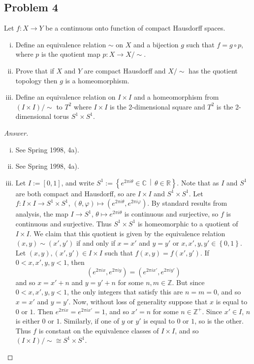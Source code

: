 \documentclass[12pt]{article}
\newcommand{\z}{\mathbb{Z}}
\newcommand{\cx}{\mathbb{C}}
\newcommand{\real}{\mathbb{R}}
\newcommand\paren[1]{\left( #1 \right)}
\newcommand\setb[1]{\left \{ #1 \right \}}
\theoremstyle{definition}
\begin{document}
\subsection{Problem 4}
Let $f : X \to Y$ be a continuous onto function of compact Hausdorff spaces.
\begin{enumerate}[(i)]
    \item Define an equivalence relation $\sim$ on $X$ and a bijection $g$ such that $f = g \circ p$, where $p$ is the quotient map $p : X \to X / \sim$.
    \item Prove that if $X$ and $Y$ are compact Hausdorff and $X / \sim$ has the quotient topology then $g$ is a homeomorphism.
    \item Define an equivalence relation on $I \times I$ and a homeomorphism from $(I \times I) / \sim$ to $T^2$ where $I \times I$ is the 2-dimensional square and $T^2$ is the 2-dimensional torus $S^1 \times S^1$.
\end{enumerate}
\begin{proof}[Answer]
    \noindent
    \begin{enumerate}[(i)]
        \item See Spring 1998, 4a).
        \item See Spring 1998, 4a).
        \item Let $I := [0,1]$, and write $S^1 := \setb{ e^{2\pi i \theta} \in \cx \, \middle| \, \theta \in \real }$. Note that as $I$ and $S^1$ are both compact and Hausdorff, so are $I \times I$ and $S^1 \times S^1$. Let $f : I \times I \to S^1 \times S^1$, $(\theta,\varphi) \mapsto \paren{ e^{2\pi i \theta} , e^{2\pi i \varphi} }$. By standard results from analysis, the map $I \to S^1$, $\theta \mapsto e^{2\pi i \theta}$ is continuous and surjective, so $f$ is continuous and surjective. Thus $S^1 \times S^1$ is homeomorphic to a quotient of $I \times I$. We claim that this quotient is given by the equivalence relation $(x,y) \sim (x',y')$ if and only if $x = x'$ and $y = y'$ or $x,x',y,y' \in \setb{ 0 , 1 }$. Let $(x,y) , (x',y') \in I \times I$ such that $f(x,y) = f(x',y')$. If $0 < x,x',y,y < 1$, then
        \[
            \paren{ e^{2\pi i x} , e^{2\pi i y} } = \paren{ e^{2\pi i x'} , e^{2\pi i y'} }
        \]
        and so $x = x' + n$ and $y = y' + n$ for some $n , m \in \z$. But since $0 < x,x',y,y < 1$, the only integers that satisfy this are $n = m = 0$, and so $x = x'$ and $y = y'$. Now, without loss of generality suppose that $x$ is equal to $0$ or $1$. Then $e^{2\pi i x} = e^{2\pi i x'} = 1$, and so $x' = n$ for some $n \in \z^+$. Since $x' \in I$, $n$ is either $0$ or $1$. Similarly, if one of $y$ or $y'$ is equal to $0$ or $1$, so is the other. Thus $f$ is constant on the equivalence classes of $I \times I$, and so $\paren{ I \times I } / \sim \cong S^1 \times S^1$.
    \end{enumerate}
\end{proof}
\end{document}
